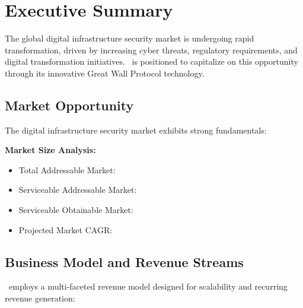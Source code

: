 \section{Executive Summary}\label{sec:executive-summary}


The global digital infrastructure security market is undergoing rapid transformation, driven by increasing cyber threats, regulatory requirements, and digital transformation initiatives. \companyname\ is positioned to capitalize on this opportunity through its innovative Great Wall Protocol technology.

\subsection{Market Opportunity}

The digital infrastructure security market exhibits strong fundamentals:

\begin{executivebox}
\textbf{Market Size Analysis:}
\begin{itemize}
    \item Total Addressable Market: 
    \item Serviceable Addressable Market: 
    \item Serviceable Obtainable Market: 
    \item Projected Market CAGR: 
\end{itemize}
\end{executivebox}


\subsection{Business Model and Revenue Streams}

\companyname\ employs a multi-faceted revenue model designed for scalability and recurring revenue generation:

